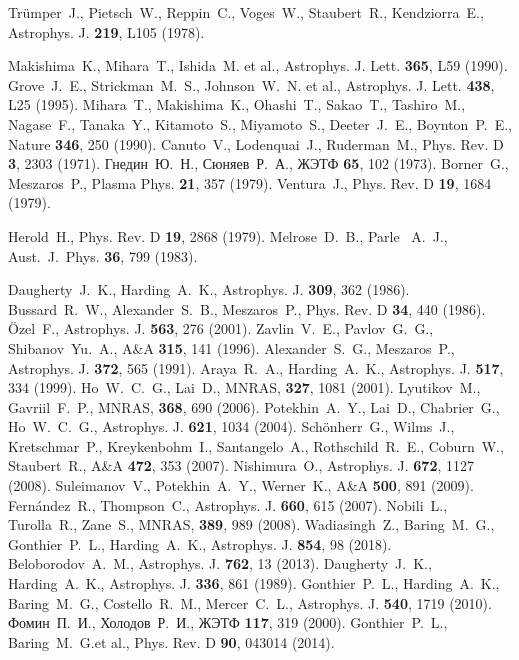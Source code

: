 \documentclass[cp1251%
               ]{jetp} %
\begin{document}
\begin{references}
%
 Tr\"{u}mper~J., Pietsch~W., Reppin~C., Voges~W., Staubert~R., Kendziorra~E., Astrophys. J. {\bf 219}, L105 (1978).
  
%
  Makishima~K., Mihara~T., Ishida~M. et al., Astrophys. J. Lett. {\bf 365}, L59 (1990).
%
  Grove~J.~E., Strickman~M.~S., Johnson~W.~N. et al., Astrophys. J. Lett. {\bf 438}, L25 (1995).
%
  Mihara~T., Makishima~K., Ohashi~T., Sakao~T., Tashiro~M., Nagase~F., Tanaka~Y., Kitamoto~S., Miyamoto~S., Deeter~J.~E., 
  Boynton~P.~E., Nature {\bf 346}, 250 (1990).
%
Canuto~V., Lodenquai~J., Ruderman~M., Phys. Rev. D {\bf 3}, 2303 (1971).
%
    Гнедин~Ю.~Н., Сюняев~Р.~А., ЖЭТФ {\bf 65}, 102 (1973).
%
  Borner~G., Meszaros~P., Plasma Phys. {\bf 21}, 357 (1979).
%
  Ventura~J., Phys. Rev. D {\bf 19}, 1684 (1979).

%
   Herold~H., Phys. Rev. D {\bf 19}, 2868 (1979).
%
  Melrose~D.~B., Parle~ A.~J.,
   Aust.~J.~Phys. {\bf 36}, 799 (1983).

%
  Daugherty~J.~K., Harding~A.~K., Astrophys. J. {\bf 309}, 362 (1986).
%
Bussard~R.~W., Alexander~S.~B., Meszaros~P., Phys. Rev. D {\bf 34}, 440 (1986).
%
  {\"O}zel~F., Astrophys. J. {\bf 563}, 276 (2001).
%
  Zavlin~V.~E., Pavlov~G.~G., Shibanov~Yu.~A., A\&A {\bf 315}, 141 (1996).
%
   Alexander~S.~G., Meszaros~P.,  Astrophys. J. {\bf 372}, 565 (1991).
%
  Araya~R.~A., Harding~A.~K.,  Astrophys. J. {\bf 517}, 334 (1999).
%
  Ho~W.~C.~G., Lai~D., MNRAS, {\bf 327}, 1081 (2001).
%
   Lyutikov~M., Gavriil~F.~P., MNRAS, {\bf 368}, 690 (2006).
%
  Potekhin~A.~Y., Lai~D., Chabrier~G., Ho~W.~C.~G., Astrophys. J. {\bf 621}, 1034 (2004).
%
   Sch{\"o}nherr~G., Wilms~J., Kretschmar~P., Kreykenbohm~I., Santangelo~A., Rothschild~R.~E., Coburn~W., Staubert~R., 
   A{\&}A {\bf 472}, 353 (2007).
%
  Nishimura~O., Astrophys. J. {\bf 672}, 1127 (2008).
   Suleimanov~V., Potekhin~A.~Y., Werner~K., A{\&}A {\bf 500}, 891 (2009).
   Fern{\'a}ndez~R., Thompson~C., Astrophys. J. {\bf 660}, 615 (2007).
Nobili~L., Turolla~R., Zane~S., MNRAS, {\bf 389}, 989 (2008).
%
Wadiasingh~Z., Baring~M.~G., Gonthier~P.~L., Harding~A.~K., Astrophys. J. {\bf 854}, 98 (2018).
%
  Beloborodov~A.~M., Astrophys. J. {\bf 762}, 13 (2013).
%
  Daugherty~J.~K., Harding~A.~K., Astrophys. J. {\bf 336}, 861 (1989).
%
Gonthier~P.~L., Harding~A.~K., Baring~M.~G., Costello~R.~M., Mercer~C.~L., Astrophys. J. {\bf 540}, 1719 (2010).
%
Фомин~П.~И., Холодов~Р.~И., ЖЭТФ {\bf 117}, 319 (2000). 
%
Gonthier~P.~L., Baring~M.~G.et al., 
   Phys. Rev. D {\bf 90},  043014 (2014).


\end{references}
\end{document}
